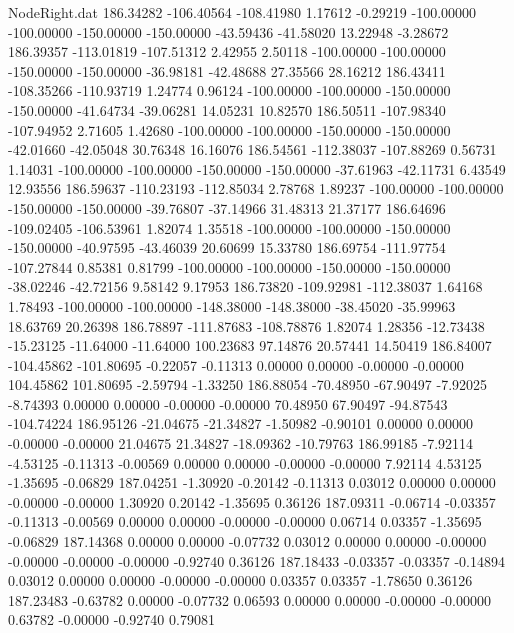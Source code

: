 \begin{filecontents}{NodeRight.dat}
 186.34282 -106.40564 -108.41980     1.17612   -0.29219 -100.00000 -100.00000 -150.00000 -150.00000  -43.59436  -41.58020   13.22948   -3.28672
 186.39357 -113.01819 -107.51312     2.42955    2.50118 -100.00000 -100.00000 -150.00000 -150.00000  -36.98181  -42.48688   27.35566   28.16212
 186.43411 -108.35266 -110.93719     1.24774    0.96124 -100.00000 -100.00000 -150.00000 -150.00000  -41.64734  -39.06281   14.05231   10.82570
 186.50511 -107.98340 -107.94952     2.71605    1.42680 -100.00000 -100.00000 -150.00000 -150.00000  -42.01660  -42.05048   30.76348   16.16076
 186.54561 -112.38037 -107.88269     0.56731    1.14031 -100.00000 -100.00000 -150.00000 -150.00000  -37.61963  -42.11731    6.43549   12.93556
 186.59637 -110.23193 -112.85034     2.78768    1.89237 -100.00000 -100.00000 -150.00000 -150.00000  -39.76807  -37.14966   31.48313   21.37177
 186.64696 -109.02405 -106.53961     1.82074    1.35518 -100.00000 -100.00000 -150.00000 -150.00000  -40.97595  -43.46039   20.60699   15.33780
 186.69754 -111.97754 -107.27844     0.85381    0.81799 -100.00000 -100.00000 -150.00000 -150.00000  -38.02246  -42.72156    9.58142    9.17953
 186.73820 -109.92981 -112.38037     1.64168    1.78493 -100.00000 -100.00000 -148.38000 -148.38000  -38.45020  -35.99963   18.63769   20.26398
 186.78897 -111.87683 -108.78876     1.82074    1.28356  -12.73438  -15.23125  -11.64000  -11.64000  100.23683   97.14876   20.57441   14.50419
 186.84007 -104.45862 -101.80695    -0.22057   -0.11313    0.00000    0.00000   -0.00000   -0.00000  104.45862  101.80695   -2.59794   -1.33250
 186.88054  -70.48950  -67.90497    -7.92025   -8.74393    0.00000    0.00000   -0.00000   -0.00000   70.48950   67.90497  -94.87543 -104.74224
 186.95126  -21.04675  -21.34827    -1.50982   -0.90101    0.00000    0.00000   -0.00000   -0.00000   21.04675   21.34827  -18.09362  -10.79763
 186.99185   -7.92114   -4.53125    -0.11313   -0.00569    0.00000    0.00000   -0.00000   -0.00000    7.92114    4.53125   -1.35695   -0.06829
 187.04251   -1.30920   -0.20142    -0.11313    0.03012    0.00000    0.00000   -0.00000   -0.00000    1.30920    0.20142   -1.35695    0.36126
 187.09311   -0.06714   -0.03357    -0.11313   -0.00569    0.00000    0.00000   -0.00000   -0.00000    0.06714    0.03357   -1.35695   -0.06829
 187.14368    0.00000    0.00000    -0.07732    0.03012    0.00000    0.00000   -0.00000   -0.00000   -0.00000   -0.00000   -0.92740    0.36126
 187.18433   -0.03357   -0.03357    -0.14894    0.03012    0.00000    0.00000   -0.00000   -0.00000    0.03357    0.03357   -1.78650    0.36126
 187.23483   -0.63782    0.00000    -0.07732    0.06593    0.00000    0.00000   -0.00000   -0.00000    0.63782   -0.00000   -0.92740    0.79081

\end{filecontents}
